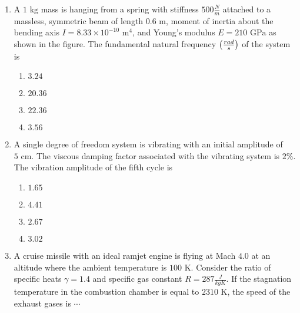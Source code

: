 \documentclass[journal,12pt,twocolumn]{IEEEtran}
\theoremstyle{remark}
\begin{document}
\begin{enumerate}[start=40]
    \item A $1 \text{ kg}$ mass is hanging from a spring with stiffness $500 \frac{N}{m}$ attached to a massless, symmetric beam of length $0.6 \text{ m}$, moment of inertia about the bending axis $I = 8.33 \times 10^{-10} \text{ m}^4$, and Young's modulus $E = 210 \text{ GPa}$ as shown in the figure. The fundamental natural frequency $\left(\frac{rad}{s}\right)$ of the system is


	    \begin{enumerate}
        \item $3.24$
        \item $20.36$
        \item $22.36$
        \item $3.56$
    \end{enumerate}

    \item A single degree of freedom system is vibrating with an initial  amplitude of $5 \text{ cm}$. The viscous damping factor associated with the vibrating system is $2\%$. The vibration amplitude of the fifth cycle  is
    \begin{enumerate}
        \item $1.65$
        \item $4.41$
        \item $2.67$
        \item $3.02$
    \end{enumerate}

    \item A cruise missile with an ideal ramjet engine is flying at Mach $4.0$ at an altitude where the ambient temperature is $100 \text{ K}$. Consider the ratio of specific heats $\gamma = 1.4$ and specific gas constant $R = 287 \frac{J}{kg K}$. If the stagnation temperature in the combustion chamber is equal to $2310 \text{ K}$, the speed of the exhaust gases  is $\cdots$


\end{enumerate}
\end{document}
